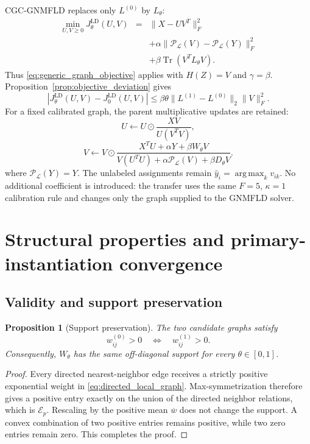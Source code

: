 \documentclass[11pt]{article}
\newtheorem{proposition}{Proposition}
\theoremstyle{remark}
\newcommand{\Tr}{\operatorname{Tr}}
\newcommand{\argmaxop}{\operatorname*{arg\,max}}
\newcommand{\had}{\odot}
\begin{document}
CGC-GNMFLD replaces only $L^{(0)}$ by $L_\theta$:
\begin{eqnarray}
\min_{U,V\ge0}
J_{\theta}^{\mathrm{LD}}(U,V)
&=&\|X-UV^{T}\|_{F}^{2}\nonumber\\
&&+\alpha\|\mathcal P_{\mathcal L}(V)-\mathcal P_{\mathcal L}(Y)\|_{F}^{2}\nonumber\\
&&+\beta\Tr(V^{T}L_{\theta}V).
\end{eqnarray}
Thus \eqref{eq:generic_graph_objective} applies with $H(Z)=V$ and $\gamma=\beta$. Proposition~\ref{prop:objective_deviation} gives
\[
\left|
J_{\theta}^{\mathrm{LD}}(U,V)-J_{0}^{\mathrm{LD}}(U,V)
\right|
\le
\beta\theta
\|L^{(1)}-L^{(0)}\|_2
\|V\|_F^2.
\]
For a fixed calibrated graph, the parent multiplicative updates are retained:
\[
U\leftarrow U\had\frac{XV}{U(V^{T}V)},
\]
\[
V\leftarrow V\had
\frac{X^{T}U+\alpha Y+\beta W_{\theta}V}
{V(U^{T}U)+\alpha\mathcal P_{\mathcal L}(V)+\beta D_{\theta}V}.
\]
where $\mathcal P_{\mathcal L}(Y)=Y$. The unlabeled assignments remain $\widehat y_i=\argmaxop_k v_{ik}$. No additional coefficient is introduced: the transfer uses the same $F=5$, $\kappa=1$ calibration rule and changes only the graph supplied to the GNMFLD solver.

\section{Structural properties and primary-instantiation convergence}
\label{sec:analysis}

\subsection{Validity and support preservation}

\begin{proposition}[Support preservation]
The two candidate graphs satisfy
\[
w_{ij}^{(0)}>0\quad\Longleftrightarrow\quad w_{ij}^{(1)}>0.
\]
Consequently, $W_{\theta}$ has the same off-diagonal support for every $\theta\in[0,1]$.
\end{proposition}

\begin{proof}
Every directed nearest-neighbor edge receives a strictly positive exponential weight in \eqref{eq:directed_local_graph}. Max-symmetrization therefore gives a positive entry exactly on the union of the directed neighbor relations, which is $\mathcal E_p$. Rescaling by the positive mean $\overline w$ does not change the support. A convex combination of two positive entries remains positive, while two zero entries remain zero. This completes the proof.
\end{proof}
\end{document}

